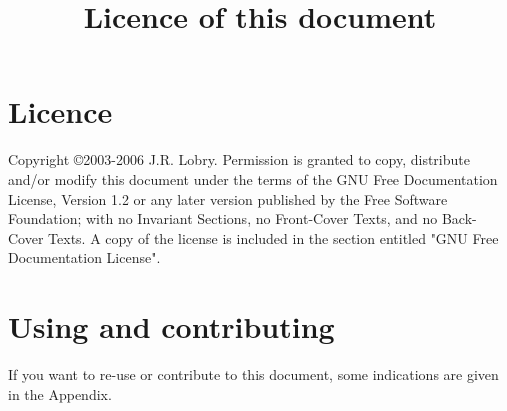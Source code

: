 \title{Licence of this document}
\section*{Licence}

    Copyright \copyright  2003-2006  J.R. Lobry.
    Permission is granted to copy, distribute and/or modify this document
    under the terms of the GNU Free Documentation License, Version 1.2
    or any later version published by the Free Software Foundation;
    with no Invariant Sections, no Front-Cover Texts, and no Back-Cover Texts.
    A copy of the license is included in the section entitled "GNU
    Free Documentation License".

\section*{Using and contributing}

If you want to re-use or contribute to this document, some indications are
given in the Appendix.
